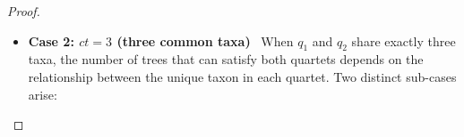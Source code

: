 \documentclass[runningheads]{llncs}
\newcommand{\addb}[1]{{\color{red} #1}}
\begin{document}
\begin{proof}
\begin{itemize}
    
    
    

\vspace{-8pt}

\item \textbf{Case 2: $ct = 3$ (three common taxa)} \ When $q_1$ and $q_2$ share exactly three taxa, the number of trees that can satisfy both quartets depends on the relationship between the unique taxon in each quartet. Two distinct sub-cases arise:


\end{itemize}
\end{proof}
\end{document}

